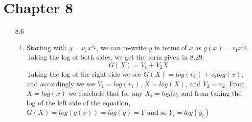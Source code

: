 \documentclass[11pt,a4paper]{article}
\begin{document}
\begin{itemize}
			 	
		\end{itemize}
		
	\section{Chapter 8}
		\begin{itemize}
			\item[8.6]
				\begin{enumerate}
					\item Starting with $y=v_1x^{v_2}$, we can re-write $y$ in terms of $x$ as $g(x)=v_1x^{v_2}$. Taking the log of both sides, we get the form given in $8.29$:
					$$G(X) = V_1 + V_2X$$
					Taking the log of the right side we see $G(X) = log(v_1) + v_2log(x)$, and accordingly we see $V_1=log(v_1)$, $X = log(X)$, and $V_2 = v_2$. From $X = log(x)$ we conclude that for any $X_i = log(x_i$ and from taking the log of the left side of the equation, $G(X) = log(g(x)) = log(y) = Y$ and so $Y_i = log(y_i)$
				\end{enumerate}
		\end{itemize}	
\end{document}
